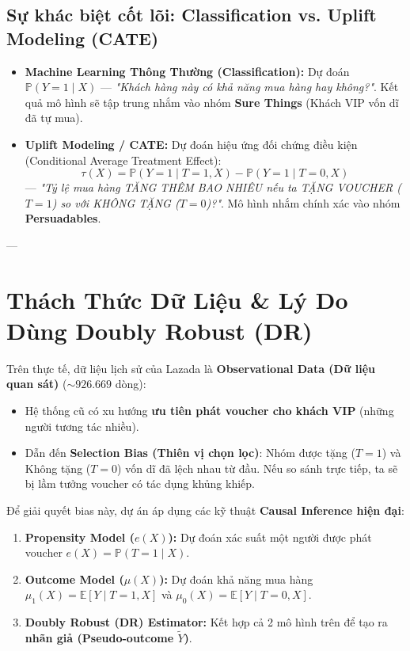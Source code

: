 \documentclass[11pt,a4paper]{article}
\newcommand{\Exp}{\mathbb{E}}
\newcommand{\Prob}{\mathbb{P}}
\begin{document}
\subsection{Sự khác biệt cốt lõi: Classification vs. Uplift Modeling (CATE)}
\begin{itemize}
    \item \textbf{Machine Learning Thông Thường (Classification):} Dự đoán $\Prob(Y=1 \mid X)$ — \textit{"Khách hàng này có khả năng mua hàng hay không?"}. Kết quả mô hình sẽ tập trung nhắm vào nhóm \textbf{Sure Things} (Khách VIP vốn dĩ đã tự mua).
    \item \textbf{Uplift Modeling / CATE:} Dự đoán hiệu ứng đối chứng điều kiện (Conditional Average Treatment Effect):
    $$\tau(X) = \Prob(Y=1 \mid T=1, X) - \Prob(Y=1 \mid T=0, X)$$
    — \textit{"Tỷ lệ mua hàng TĂNG THÊM BAO NHIÊU nếu ta TẶNG VOUCHER ($T=1$) so với KHÔNG TẶNG ($T=0$)?"}. Mô hình nhắm chính xác vào nhóm \textbf{Persuadables}.
\end{itemize}

---

\section{Thách Thức Dữ Liệu \& Lý Do Dùng Doubly Robust (DR)}

Trên thực tế, dữ liệu lịch sử của Lazada là \textbf{Observational Data (Dữ liệu quan sát)} ($\sim 926.669$ dòng):
\begin{itemize}
    \item Hệ thống cũ có xu hướng \textbf{ưu tiên phát voucher cho khách VIP} (những người tương tác nhiều).
    \item Dẫn đến \textbf{Selection Bias (Thiên vị chọn lọc)}: Nhóm được tặng ($T=1$) và Không tặng ($T=0$) vốn dĩ đã lệch nhau từ đầu. Nếu so sánh trực tiếp, ta sẽ bị lầm tưởng voucher có tác dụng khủng khiếp.
\end{itemize}

Để giải quyết bias này, dự án áp dụng các kỹ thuật \textbf{Causal Inference hiện đại}:
\begin{enumerate}
    \item \textbf{Propensity Model ($e(X)$):} Dự đoán xác suất một người được phát voucher $e(X) = \Prob(T=1 \mid X)$.
    \item \textbf{Outcome Model ($\mu(X)$):} Dự đoán khả năng mua hàng $\mu_1(X) = \Exp[Y \mid T=1, X]$ và $\mu_0(X) = \Exp[Y \mid T=0, X]$.
    \item \textbf{Doubly Robust (DR) Estimator:} Kết hợp cả 2 mô hình trên để tạo ra \textbf{nhãn giả (Pseudo-outcome $\tilde{Y}$)}.
\end{enumerate}
\end{document}
